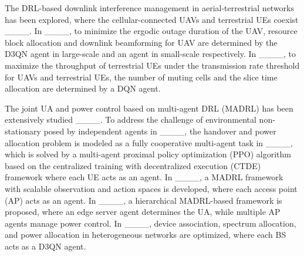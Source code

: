 The DRL-based downlink interference management in aerial-terrestrial networks has been explored, where the cellular-connected UAVs and terrestrial UEs coexist ____.
In ____, to minimize the ergodic outage duration of the UAV, resource block allocation and downlink beamforming for UAV are determined by the D3QN agent in large-scale and an agent in small-scale respectively.
In ____, to maximize the throughput of terrestrial UEs under the transmission rate threshold for UAVs and terrestrial UEs, the number of muting cells and the slice time allocation are determined by a DQN agent.

The joint UA and power control based on multi-agent DRL (MADRL) has been extensively studied ____.
To address the challenge of environmental non-stationary posed by independent agents in ____, the handover and power allocation problem is modeled as a fully cooperative multi-agent task in ____, which is solved by a multi-agent proximal policy optimization (PPO) algorithm based on the centralized training with decentralized execution (CTDE) framework where each UE acts as an agent.
In ____, a MADRL framework with scalable observation and action spaces is developed, where each access point (AP) acts as an agent.
In ____, a hierarchical MADRL-based framework is proposed, where an edge server agent determines the UA, while multiple AP agents manage power control.
In ____, device association, spectrum allocation, and power allocation in heterogeneous networks are optimized, where each BS acts as a D3QN agent.


